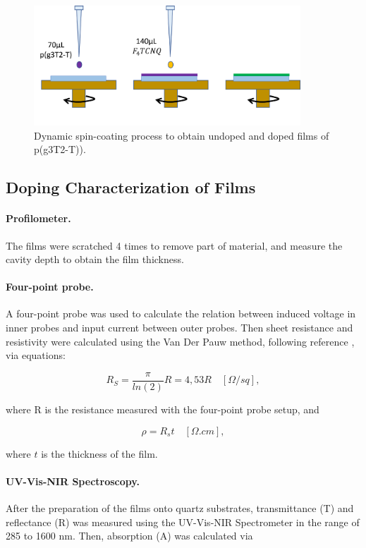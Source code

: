 \begin{figure}[ht]
  \centering
  \includegraphics[width=10cm]{Images/pdf/spin_coating.pdf}
  \caption{Dynamic spin-coating process to obtain undoped and doped films of p(g3T2-T)).}
  \label{fig:coating}
\end{figure}

\subsection{Doping Characterization of Films}

\paragraph{Profilometer.}The films were scratched 4 times to remove part of material, and measure the cavity depth to obtain the film thickness.

\paragraph{Four-point probe.} A four-point probe was used to calculate the relation between induced voltage in inner probes and input current between outer probes. Then sheet resistance and resistivity were calculated using the Van Der Pauw method, following reference \cite{resist}, via equations:

\begin{equation}\label{eq:rs}
	R_{S} = \frac{\pi}{ln(2)}R = 4,53 R \quad [\Omega/sq],
\end{equation}

where R is the resistance measured with the four-point probe setup, and

\begin{equation}\label{eq:resist}
	\rho = R_{s}t \quad [\Omega.cm],
\end{equation}
 
 where $t$ is the thickness of the film.

\paragraph{UV-Vis-NIR Spectroscopy.}After the preparation of the films onto quartz substrates, transmittance (T) and reflectance (R) was measured using the UV-Vis-NIR Spectrometer in the range of 285 to 1600 nm. Then, absorption (A) was calculated via

